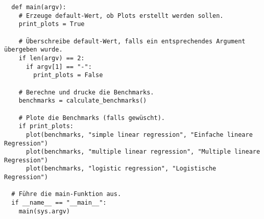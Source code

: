 \begin{verbatim}
  def main(argv):
    # Erzeuge default-Wert, ob Plots erstellt werden sollen.
    print_plots = True

    # Überschreibe default-Wert, falls ein entsprechendes Argument übergeben wurde.
    if len(argv) == 2:
      if argv[1] == "-":
        print_plots = False

    # Berechne und drucke die Benchmarks.
    benchmarks = calculate_benchmarks()

    # Plote die Benchmarks (falls gewüscht).
    if print_plots:
      plot(benchmarks, "simple linear regression", "Einfache lineare Regression")
      plot(benchmarks, "multiple linear regression", "Multiple lineare Regression")
      plot(benchmarks, "logistic regression", "Logistische Regression")

  # Führe die main-Funktion aus.
  if __name__ == "__main__":
    main(sys.argv)
\end{verbatim}
